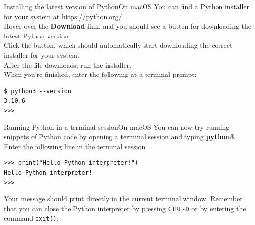 \documentclass[aspectratio=169]{beamer}
\begin{document}
\begin{frame}[fragile]{Installing the latest version of Python}{On macOS}
    You can find a Python installer for your system at \href{https://python.org/}{https://python.org/}. \\
    \vspace{10pt}
    Hover over the \textbf{Download} link, and you should see a button for downloading the latest Python version. \\
    \vspace{10pt}
    Click the button, which should automatically start downloading the correct installer for your system. \\
    \vspace{10pt}
    After the file downloads, run the installer. \\
    \vspace{10pt}
    When you're finished, enter the following at a terminal prompt:
    \vspace{10pt}
    \begin{Verbatim}
$ python3 --version
3.10.6
>>>
    \end{Verbatim}
\end{frame}


\begin{frame}[fragile]{Running Python in a terminal session}{On macOS}
    You can now try running snippets of Python code by opening a terminal session and typing \textbf{python3}.
    Enter the following line in the terminal session:\\
    \vspace{10pt}
    \begin{Verbatim}
>>> print("Hello Python interpreter!")
Hello Python interpreter!
>>>
    \end{Verbatim}
    \vspace{10pt}
    Your message should print directly in the current terminal window.
    Remember that you can close the Python interpreter by pressing \texttt{CTRL-D} or by entering the command \texttt{exit()}.
\end{frame}
\end{document}
